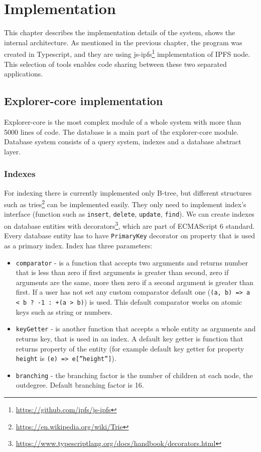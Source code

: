 \chapter{Implementation}
\label{Implementation}
This chapter describes the implementation details of the system, shows the internal
architecture. As mentioned in the previous chapter, the program was created in Typescript, and they are using js-ipfs\footnote{\url{https://github.com/ipfs/js-ipfs}} implementation of IPFS node. This selection of tools enables code sharing between these two separated applications.

\section{Explorer-core implementation}
Explorer-core is the most complex module of a whole system with more than 5000 lines of code. The database is a main part of the explorer-core module. Database system consists of a query system, indexes and a database abstract layer. 

\subsection{Indexes}
For indexing there is currently implemented only B-tree, but different structures such as tries\footnote{\url{https://en.wikipedia.org/wiki/Trie}} can be implemented easily. They only need to implement index's interface (function such as \texttt{insert}, \texttt{delete}, \texttt{update}, \texttt{find}). We can create indexes on database entities with decorators\footnote{\url{https://www.typescriptlang.org/docs/handbook/decorators.html}}, which are part of ECMAScript 6 standard. Every database entity has to have \texttt{PrimaryKey} decorator on property that is used as a primary index. Index has three parameters:
\begin{itemize}
    \item \texttt{comparator} - is a function that accepts two arguments and returns number that is less than zero if first arguments is greater than second, zero if arguments are the same, more then zero if a second argument is greater than first. If a user has not set any custom comparator default one (\texttt{(a, b) =>
    a < b ? -1 : +(a > b)}) is used. This default comparator works on atomic keys such as string or numbers. 
    \item \texttt{keyGetter} - is another function that accepts a whole entity as arguments and returns key, that is used in an index. A default key getter is function that returns property of the entity (for example default key getter for property \texttt{height} is \texttt{(e) =>  e[''height'']}).
    \item \texttt{branching} - the branching factor is the number of children at each node, the outdegree. Default branching factor is 16.
\end{itemize}

